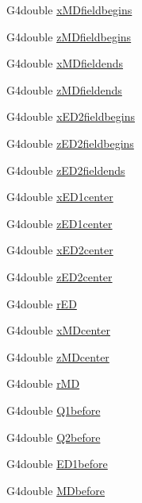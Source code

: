 \begin{DoxyCompactItemize}
G4double \hyperlink{EMFieldDebugger_8hh_a20f1012cd491461a26923d2c5e7bf9e9}{x\+M\+Dfieldbegins}
\item 
G4double \hyperlink{EMFieldDebugger_8hh_a69783c655a650a2d465aa29adb99becd}{z\+M\+Dfieldbegins}
\item 
G4double \hyperlink{EMFieldDebugger_8hh_a159fc7800979fa9630bfc45a7f78596c}{x\+M\+Dfieldends}
\item 
G4double \hyperlink{EMFieldDebugger_8hh_ac69dbd129f1b938df9976d51f7593e8d}{z\+M\+Dfieldends}
\item 
G4double \hyperlink{EMFieldDebugger_8hh_a1756cc9671bdb5e3fef3244359b6d3cc}{x\+E\+D2fieldbegins}
\item 
G4double \hyperlink{EMFieldDebugger_8hh_ad016826f85af9d76258e59348edeb364}{z\+E\+D2fieldbegins}
\item 
G4double \hyperlink{EMFieldDebugger_8hh_a9d0bd55552fe4d1f2f44f49d35cc081e}{z\+E\+D2fieldends}
\item 
G4double \hyperlink{EMFieldDebugger_8hh_a244d4cfe9b2fed8a950b5260924858ff}{x\+E\+D1center}
\item 
G4double \hyperlink{EMFieldDebugger_8hh_a74ebfc53f3a93114f6d28295ee4ab9f4}{z\+E\+D1center}
\item 
G4double \hyperlink{EMFieldDebugger_8hh_a3c58a920166faad49e1879314c55c5be}{x\+E\+D2center}
\item 
G4double \hyperlink{EMFieldDebugger_8hh_ac98e44690840a121652fcb08b156a635}{z\+E\+D2center}
\item 
G4double \hyperlink{EMFieldDebugger_8hh_a715d053d73470185e7c2c4702d9dc2de}{r\+ED}
\item 
G4double \hyperlink{EMFieldDebugger_8hh_aebdd7edbdb400c898923e8d3722725bf}{x\+M\+Dcenter}
\item 
G4double \hyperlink{EMFieldDebugger_8hh_ac5e70ecd77b70fb29053de3d744defbe}{z\+M\+Dcenter}
\item 
G4double \hyperlink{EMFieldDebugger_8hh_a7fd4fbedfa36308277282111f3a02a2e}{r\+MD}
\item 
G4double \hyperlink{EMFieldDebugger_8hh_a6a82266fb838ffa86812c6000c9dc287}{Q1before}
\item 
G4double \hyperlink{EMFieldDebugger_8hh_a5566ea3bf099349decdfcf3c26fc376c}{Q2before}
\item 
G4double \hyperlink{EMFieldDebugger_8hh_a75fe85cecce8dd0b8fa08cf97cee4ce2}{E\+D1before}
\item 
G4double \hyperlink{EMFieldDebugger_8hh_a003204f9438882eab89ba42ae5708f37}{M\+Dbefore}
\item 

\end{DoxyCompactItemize}
